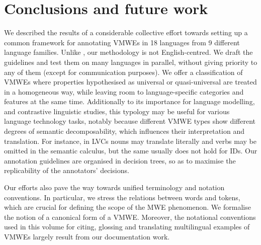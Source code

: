 \documentclass[output=paper,modfonts]{langscibook}
\begin{document}
\section{Conclusions and future work}
\label{sec:conclusions}
%
We described the results of a considerable collective effort towards setting up a common framework for annotating VMWEs in 18 languages from 9 different language families. Unlike \citet{mcdonald-EtAl:2013:Short}, our methodology is not English-centred. We draft the guidelines and test them on many languages in parallel, without giving priority to any of them (except for communication purposes). 
We offer a classification of VMWEs where properties hypothesised as universal or quasi-universal are treated in a homogeneous way, while leaving room to language-specific categories and features at the same time. Additionally to its importance for language modelling, and contrastive linguistic studies, this typology may be useful for various language technology tasks, notably because different VMWE types show different degrees of semantic decomposability, which influences their interpretation and translation. For instance, in LVCs nouns may translate literally and verbs may be omitted in the semantic calculus,  but the same usually does not hold for IDs.
Our annotation guidelines are organised in decision trees, so as to maximise the replicability of the annotators' decisions. 

Our efforts also pave the way towards unified terminology and notation conventions. In particular, we stress the relations between words and tokens, which are crucial for defining the scope of the MWE phenomenon. We formalise the notion of a canonical form of a VMWE. Moreover, the notational conventions used in this volume for citing, glossing and translating multilingual examples of VMWEs largely result from our documentation work.
\end{document}
